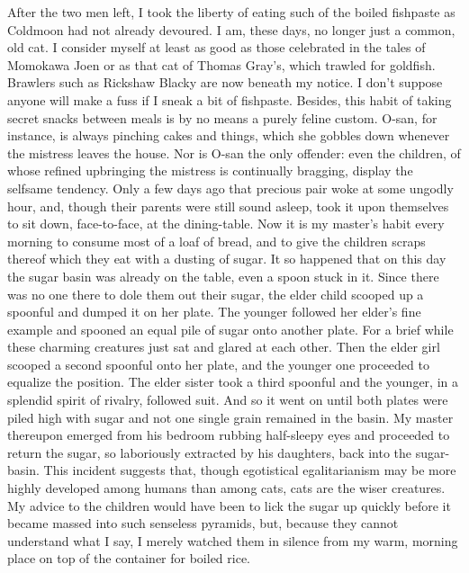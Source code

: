 \documentclass[12pt, openright]{book}
\begin{document}
After the two men left, I took the liberty of eating such of the boiled
fishpaste as Coldmoon had not already devoured. I am, these days, no
longer just a common, old cat. I consider myself at least as good as
those celebrated in the tales of Momokawa Joen or as that cat of Thomas
Gray's, which trawled for goldfish. Brawlers such as Rickshaw Blacky are
now beneath my notice. I don't suppose anyone will make a fuss if I
sneak a bit of fishpaste. Besides, this habit of taking secret snacks
between meals is by no means a purely feline custom. O-san, for
instance, is always pinching cakes and things, which she gobbles down
whenever the mistress leaves the house. Nor is O-san the only offender:
even the children, of whose refined upbringing the mistress is
continually bragging, display the selfsame tendency. Only a few days ago
that precious pair woke at some ungodly hour, and, though their parents
were still sound asleep, took it upon themselves to sit down,
face-to-face, at the dining-table. Now it is my master's habit every
morning to consume most of a loaf of bread, and to give the children
scraps thereof which they eat with a dusting of sugar. It so happened
that on this day the sugar basin was already on the table, even a spoon
stuck in it. Since there was no one there to dole them out their sugar,
the elder child scooped up a spoonful and dumped it on her plate. The
younger followed her elder's fine example and spooned an equal pile of
sugar onto another plate. For a brief while these charming creatures
just sat and glared at each other. Then the elder girl scooped a second
spoonful onto her plate, and the younger one proceeded to equalize the
position. The elder sister took a third spoonful and the younger, in a
splendid spirit of rivalry, followed suit. And so it went on until both
plates were piled high with sugar and not one single grain remained in
the basin. My master thereupon emerged from his bedroom rubbing
half-sleepy eyes and proceeded to return the sugar, so laboriously
extracted by his daughters, back into the sugar-basin. This incident
suggests that, though egotistical egalitarianism may be more highly
developed among humans than among cats, cats are the wiser creatures. My
advice to the children would have been to lick the sugar up quickly
before it became massed into such senseless pyramids, but, because they
cannot understand what I say, I merely watched them in silence from my
warm, morning place on top of the container for boiled rice.
\end{document}

